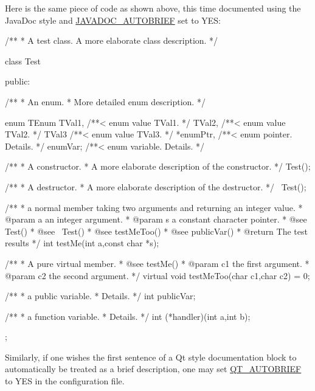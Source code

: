 Here is the same piece of code as shown above, this time documented using the JavaDoc style and \hyperlink{config_cfg_javadoc_autobrief}{JAVADOC\_\-AUTOBRIEF} set to YES: 
\begin{DoxyCodeInclude}
/**
 *  A test class. A more elaborate class description.
 */

class Test
{
  public:

    /** 
     * An enum.
     * More detailed enum description.
     */

    enum TEnum { 
          TVal1, /**< enum value TVal1. */  
          TVal2, /**< enum value TVal2. */  
          TVal3  /**< enum value TVal3. */  
         } 
       *enumPtr, /**< enum pointer. Details. */
       enumVar;  /**< enum variable. Details. */
       
      /**
       * A constructor.
       * A more elaborate description of the constructor.
       */
      Test();

      /**
       * A destructor.
       * A more elaborate description of the destructor.
       */
     ~Test();
    
      /**
       * a normal member taking two arguments and returning an integer value.
       * @param a an integer argument.
       * @param s a constant character pointer.
       * @see Test()
       * @see ~Test()
       * @see testMeToo()
       * @see publicVar()
       * @return The test results
       */
       int testMe(int a,const char *s);
       
      /**
       * A pure virtual member.
       * @see testMe()
       * @param c1 the first argument.
       * @param c2 the second argument.
       */
       virtual void testMeToo(char c1,char c2) = 0;
   
      /** 
       * a public variable.
       * Details.
       */
       int publicVar;
       
      /**
       * a function variable.
       * Details.
       */
       int (*handler)(int a,int b);
};

\end{DoxyCodeInclude}
 

Similarly, if one wishes the first sentence of a Qt style documentation block to automatically be treated as a brief description, one may set \hyperlink{config_cfg_qt_autobrief}{QT\_\-AUTOBRIEF} to YES in the configuration file.

